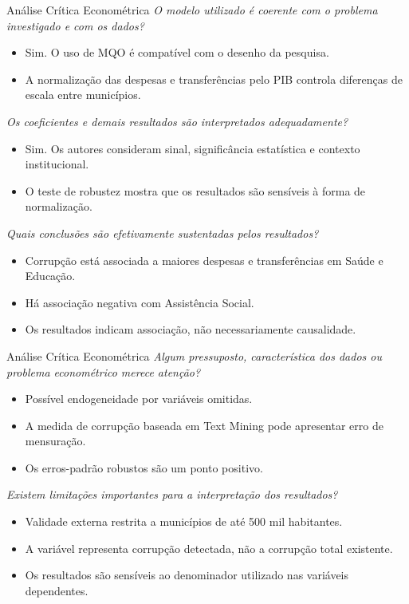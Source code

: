 \documentclass[
  10pt,
  ignorenonframetext,
  aspectratio=169,
  brazilian,
]{beamer}
\providecommand{\tightlist}{%
  \setlength{\itemsep}{0pt}\setlength{\parskip}{0pt}}
\begin{document}
\begin{frame}{Análise Crítica Econométrica}
\protect{}\label{anuxe1lise-cruxedtica-economuxe9trica}
\emph{O modelo utilizado é coerente com o problema investigado e com os
dados?}

\begin{itemize}
\tightlist
\item
  Sim. O uso de MQO é compatível com o desenho da pesquisa.
\item
  A normalização das despesas e transferências pelo PIB controla
  diferenças de escala entre municípios.
\end{itemize}

\emph{Os coeficientes e demais resultados são interpretados
adequadamente?}

\begin{itemize}
\tightlist
\item
  Sim. Os autores consideram sinal, significância estatística e contexto
  institucional.
\item
  O teste de robustez mostra que os resultados são sensíveis à forma de
  normalização.
\end{itemize}

\emph{Quais conclusões são efetivamente sustentadas pelos resultados?}

\begin{itemize}
\tightlist
\item
  Corrupção está associada a maiores despesas e transferências em Saúde
  e Educação.
\item
  Há associação negativa com Assistência Social.
\item
  Os resultados indicam associação, não necessariamente causalidade.
\end{itemize}
\end{frame}

\begin{frame}{Análise Crítica Econométrica}
\protect{}\label{anuxe1lise-cruxedtica-economuxe9trica-1}
\emph{Algum pressuposto, característica dos dados ou problema
econométrico merece atenção?}

\begin{itemize}
\tightlist
\item
  Possível endogeneidade por variáveis omitidas.
\item
  A medida de corrupção baseada em Text Mining pode apresentar erro de
  mensuração.
\item
  Os erros-padrão robustos são um ponto positivo.
\end{itemize}

\emph{Existem limitações importantes para a interpretação dos
resultados?}

\begin{itemize}
\tightlist
\item
  Validade externa restrita a municípios de até 500 mil habitantes.
\item
  A variável representa corrupção detectada, não a corrupção total
  existente.
\item
  Os resultados são sensíveis ao denominador utilizado nas variáveis
  dependentes.
\end{itemize}
\end{frame}
\end{document}
